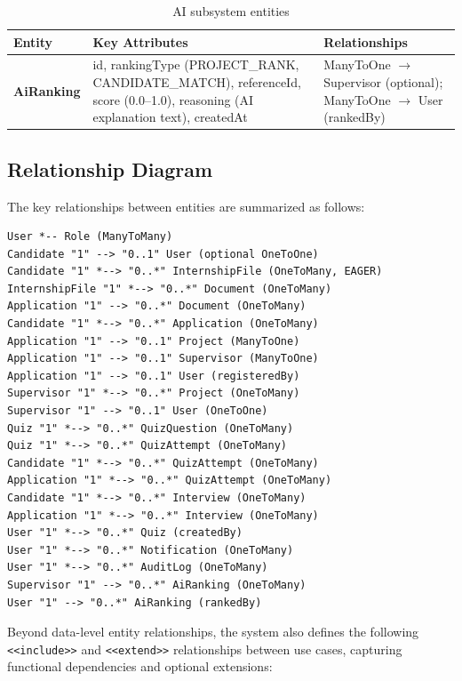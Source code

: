 \begin{table}[H]
\centering
\small
\begin{tabular}{|p{2.5cm}|p{4cm}|p{6.5cm}|}
\hline
\rowcolor{gray!20}
\textbf{Entity} & \textbf{Key Attributes} & \textbf{Relationships} \\
\hline
\textbf{AiRanking} & id, rankingType (PROJECT\_RANK, CANDIDATE\_MATCH), referenceId, score (0.0--1.0), reasoning (AI explanation text), createdAt & ManyToOne $\rightarrow$ Supervisor (optional); ManyToOne $\rightarrow$ User (rankedBy) \\
\hline
\end{tabular}
\caption{AI subsystem entities}
\end{table}

\subsection{Relationship Diagram}
The key relationships between entities are summarized as follows:

\begin{verbatim}
User *-- Role (ManyToMany)
Candidate "1" --> "0..1" User (optional OneToOne)
Candidate "1" *--> "0..*" InternshipFile (OneToMany, EAGER)
InternshipFile "1" *--> "0..*" Document (OneToMany)
Application "1" --> "0..*" Document (OneToMany)
Candidate "1" *--> "0..*" Application (OneToMany)
Application "1" --> "0..1" Project (ManyToOne)
Application "1" --> "0..1" Supervisor (ManyToOne)
Application "1" --> "0..1" User (registeredBy)
Supervisor "1" *--> "0..*" Project (OneToMany)
Supervisor "1" --> "0..1" User (OneToOne)
Quiz "1" *--> "0..*" QuizQuestion (OneToMany)
Quiz "1" *--> "0..*" QuizAttempt (OneToMany)
Candidate "1" *--> "0..*" QuizAttempt (OneToMany)
Application "1" *--> "0..*" QuizAttempt (OneToMany)
Candidate "1" *--> "0..*" Interview (OneToMany)
Application "1" *--> "0..*" Interview (OneToMany)
User "1" *--> "0..*" Quiz (createdBy)
User "1" *--> "0..*" Notification (OneToMany)
User "1" *--> "0..*" AuditLog (OneToMany)
Supervisor "1" --> "0..*" AiRanking (OneToMany)
User "1" --> "0..*" AiRanking (rankedBy)
\end{verbatim}

Beyond data-level entity relationships, the system also defines the following \texttt{<<include>>} and \texttt{<<extend>>} relationships between use cases, capturing functional dependencies and optional extensions:

